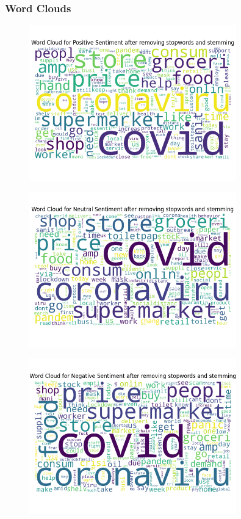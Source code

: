\documentclass[12pt,a4paper]{article}
\begin{document}
\subsubsection{Word Clouds}
\begin{figure}[H]
\centering
\includegraphics[width=0.8\textwidth]{Assignment 2/q1/wordcloud_Positive_stemming_and_removeStopwords.png}
\end{figure}

\begin{figure}[H]
\centering
\includegraphics[width=0.8\textwidth]{Assignment 2/q1/wordcloud_Neutral_stemming_and_removeStopwords.png}
\end{figure}

\begin{figure}[H]
\centering
\includegraphics[width=0.8\textwidth]{Assignment 2/q1/wordcloud_Negative_stemming_and_removeStopwords.png}
\end{figure}
\end{document}
